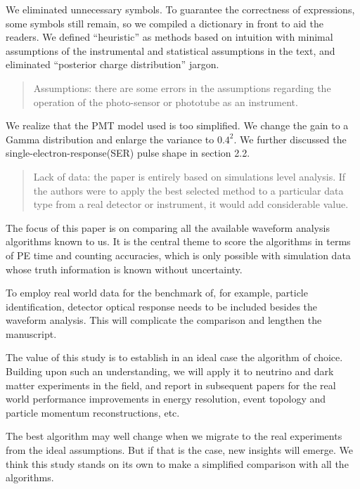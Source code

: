 \documentclass[12pt]{article}
\begin{document}
We eliminated unnecessary symbols. To guarantee the correctness of expressions, some symbols still remain, so we compiled a dictionary in front to aid the readers.  We defined ``heuristic'' as methods based on intuition with minimal assumptions of the instrumental and statistical assumptions in the text, and eliminated ``posterior charge distribution'' jargon.

\begin{quote}
Assumptions: there are some errors in the assumptions regarding the operation of the photo-sensor or phototube as an instrument.
\end{quote}

We realize that the PMT model used is too simplified. We change the gain to a Gamma distribution and enlarge the variance to $0.4^2$.  We further discussed the single-electron-response(SER) pulse shape in section 2.2. 

\begin{quote}
Lack of data: the paper is entirely based on simulations level analysis. If the authors were to apply the best selected method to a particular data type from a real detector or instrument, it would add considerable value.
\end{quote}

The focus of this paper is on comparing all the available waveform analysis algorithms known to us.  It is the central theme to score the algorithms in terms of PE time and counting accuracies, which is only possible with simulation data whose truth information is known without uncertainty.

To employ real world data for the benchmark of, for example, particle identification, detector optical response needs to be included besides the waveform analysis.  This will complicate the comparison and lengthen the manuscript.

The value of this study is to establish in an ideal case the algorithm of choice.  Building upon such an understanding, we will apply it to neutrino and dark matter experiments in the field, and report in subsequent papers for the real world performance improvements in energy resolution, event topology and particle momentum reconstructions, etc.

The best algorithm may well change when we migrate to the real experiments from the ideal assumptions.  But if that is the case, new insights will emerge.  We think this study stands on its own to make a simplified comparison with all the algorithms.
\end{document}

